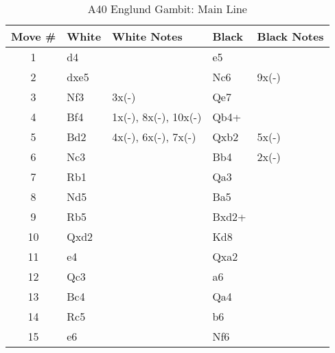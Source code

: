 \begin{table}[htbp]
\centering
\scriptsize
\caption[]{A40 Englund Gambit: Main Line}
\begin{tabular}{|c|l|p{5cm}|l|p{5cm}|}
\hline
\textbf{Move \#} & \textbf{White} & \textbf{White Notes} & \textbf{Black} & \textbf{Black Notes} \\
\hline
1  & d4    &                     & e5    &                        \\
2  & dxe5  &                     & Nc6   & 9x(-)                  \\
3  & Nf3   & 3x(-)               & Qe7   &                        \\
4  & Bf4   & 1x(-), 8x(-), 10x(-) & Qb4+  &                        \\
5  & Bd2   & 4x(-), 6x(-), 7x(-) & Qxb2  & 5x(-)                  \\
6  & Nc3   &                     & Bb4   & 2x(-)                  \\
7  & Rb1   &                     & Qa3   &                        \\
8  & Nd5   &                     & Ba5   &                        \\
9  & Rb5   &                     & Bxd2+ &                        \\
10 & Qxd2  &                     & Kd8   &                        \\
11 & e4    &                     & Qxa2  &                        \\
12 & Qc3   &                     & a6    &                        \\
13 & Bc4   &                     & Qa4   &                        \\
14 & Rc5   &                     & b6    &                        \\
15 & e6    &                     & Nf6   &                        \\
\hline
\end{tabular}
\end{table}


